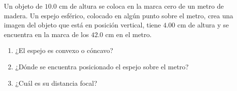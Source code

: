 \item Un objeto de $10.0\text{ cm}$ de altura se coloca en la marca cero de un metro de madera. Un espejo esférico, colocado en algún punto sobre el metro, crea una imagen del objeto que está en posición vertical, tiene $4.00\text{ cm}$ de altura y se encuentra en la marca de los $42.0\text{ cm}$ en el metro.
\begin{enumerate}
    \item ¿El espejo es convexo o cóncavo?
    \item ¿Dónde se encuentra posicionado el espejo sobre el metro?
    \item ¿Cuál es su distancia focal?
\end{enumerate}